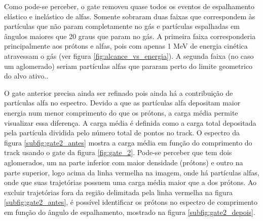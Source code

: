 \documentclass[a4paper,12pt,oneside]{book}
\begin{document}
\par Como pode-se perceber, o gate removeu quase todos os eventos de espalhamento elástico e inelástico de alfas. Somente sobraram duas faixas que correspondem às partículas que não param completamente no gás e partículas espalhadas em ângulos maiores que 20 graus que param no gás. A primeira faixa corresponderia principalmente aos prótons e alfas, pois com apenas 1 MeV de energia cinética atravessam o gás (ver figura \ref{fig:alcance_vs_energia}). A segunda faixa (no caso um aglomerado) seriam partículas alfas que pararam perto do limite geometrico do alvo ativo..


\par O gate anterior precisa ainda ser refinado pois ainda há a contribuição de partículas alfa no espectro. Devido a que as partículas alfa depositam maior energia num menor comprimento do que os prótons, a carga média permite visualizar essa diferença. A carga média é definida como a carga total depositada pela partícula dividida pelo número total de pontos no track. O espectro da figura \ref{subfig:gate2_antes} mostra a carga média em função do comprimento do track usando o gate da figura \ref{fig:gate_2}. Pode-se perceber que tem dois aglomerados, um na parte inferior com maior densidade (prótons) e outro na parte superior, logo acima da linha vermelha na imagem, onde há partículas alfas, onde que suas trajetórias possuem uma carga média maior que a dos prótons. Ao excluir trajetórias fora da região delimitada pela linha vermelha na figura \ref{subfig:gate2_antes}, é possível identificar os prótons no espectro de comprimento em função do ângulo de espalhamento, mostrado na figura \ref{subfig:gate2_depois}.



\end{document}
